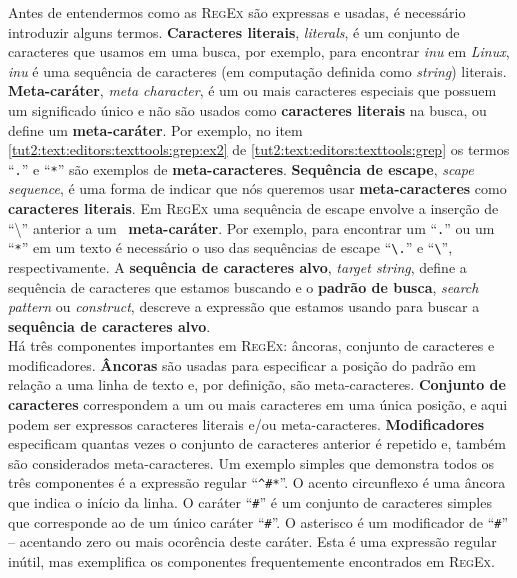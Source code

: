 \begin{refsection}
Antes de entendermos como as \textsc{RegEx} são expressas e usadas, é necessário introduzir alguns termos. \textbf{Caracteres literais}, \textit{literals}, é um conjunto de caracteres que usamos em uma busca, por exemplo, para encontrar \textit{inu} em \textit{Linux}, \textit{inu} é uma sequência de caracteres (em computação definida como \textit{string}) literais. \textbf{Meta-caráter}, \textit{meta character}, é um ou mais caracteres especiais que possuem um significado único e não são usados como \textbf{caracteres literais} na busca, ou define um \textbf{meta-caráter}. Por exemplo, no item \ref{tut2:text:editors:texttools:grep:ex2} de \ref{tut2:text:editors:texttools:grep} os termos ``\texttt{.}'' e ``\texttt{*}'' são exemplos de \textbf{meta-caracteres}. \textbf{Sequência de escape}, \textit{scape sequence}, é uma forma de indicar que nós queremos usar \textbf{meta-caracteres} como \textbf{caracteres literais}. Em \textsc{RegEx} uma sequência de escape envolve a inserção de ``\textbackslash {}'' anterior a um \
\textbf{meta-caráter}. Por exemplo, para encontrar um ``\texttt{.}'' ou um ``\texttt{*}'' em um texto é necessário o uso das sequências de escape ``\texttt{\textbackslash .}'' e ``\texttt{\textbackslash *}'', respectivamente. A \textbf{sequência de caracteres alvo}, \textit{target string}, define a sequência de caracteres que estamos buscando e o \textbf{padrão de busca}, \textit{search pattern} ou \textit{construct}, descreve a expressão que estamos usando para buscar a \textbf{sequência de caracteres alvo}.\\

Há três componentes importantes em \textsc{RegEx}: âncoras, conjunto de caracteres e modificadores. \textbf{Âncoras} são usadas para especificar a posição do padrão em relação a uma linha de texto e, por definição, são meta-caracteres. \textbf{Conjunto de caracteres} correspondem a um ou mais caracteres em uma única posição, e aqui podem ser expressos caracteres literais e/ou meta-caracteres. \textbf{Modificadores} especificam quantas vezes o conjunto de caracteres anterior é repetido e, também são considerados meta-caracteres. Um exemplo simples que demonstra todos os três componentes é a expressão regular ``\texttt{\^{}\#*}''. O acento circunflexo é uma âncora que indica o início da linha. O caráter ``\texttt{\#}'' é um conjunto de caracteres simples que corresponde ao de um único caráter ``\texttt{\#}''. O asterisco é um modificador de ``\texttt{\#}'' -- acentando zero ou mais ocorência deste caráter. Esta é uma expressão regular inútil, mas exemplifica os componentes frequentemente encontrados em \textsc{RegEx}.\\


\end{refsection}
